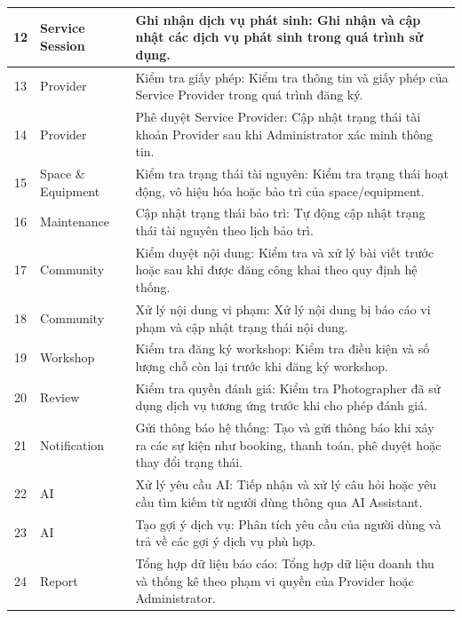 \begin{table}[H]
\begin{tabular}{|c|p{3cm}|p{6cm}|}
		12 & Service Session & Ghi nhận dịch vụ phát sinh: Ghi nhận và cập nhật các dịch vụ phát sinh trong quá trình sử dụng. \\
		\hline
		
		13 & Provider & Kiểm tra giấy phép: Kiểm tra thông tin và giấy phép của Service Provider trong quá trình đăng ký. \\
		\hline
		
		14 & Provider & Phê duyệt Service Provider: Cập nhật trạng thái tài khoản Provider sau khi Administrator xác minh thông tin. \\
		\hline
		
		15 & Space \& Equipment & Kiểm tra trạng thái tài nguyên: Kiểm tra trạng thái hoạt động, vô hiệu hóa hoặc bảo trì của space/equipment. \\
		\hline
		
		16 & Maintenance & Cập nhật trạng thái bảo trì: Tự động cập nhật trạng thái tài nguyên theo lịch bảo trì. \\
		\hline
		
		17 & Community & Kiểm duyệt nội dung: Kiểm tra và xử lý bài viết trước hoặc sau khi được đăng công khai theo quy định hệ thống. \\
		\hline
		
		18 & Community & Xử lý nội dung vi phạm: Xử lý nội dung bị báo cáo vi phạm và cập nhật trạng thái nội dung. \\
		\hline
		
		19 & Workshop & Kiểm tra đăng ký workshop: Kiểm tra điều kiện và số lượng chỗ còn lại trước khi đăng ký workshop. \\
		\hline
		
		20 & Review & Kiểm tra quyền đánh giá: Kiểm tra Photographer đã sử dụng dịch vụ tương ứng trước khi cho phép đánh giá. \\
		\hline
		
		21 & Notification & Gửi thông báo hệ thống: Tạo và gửi thông báo khi xảy ra các sự kiện như booking, thanh toán, phê duyệt hoặc thay đổi trạng thái. \\
		\hline
		
		22 & AI & Xử lý yêu cầu AI: Tiếp nhận và xử lý câu hỏi hoặc yêu cầu tìm kiếm từ người dùng thông qua AI Assistant. \\
		\hline
		
		23 & AI & Tạo gợi ý dịch vụ: Phân tích yêu cầu của người dùng và trả về các gợi ý dịch vụ phù hợp. \\
		\hline
		
		24 & Report & Tổng hợp dữ liệu báo cáo: Tổng hợp dữ liệu doanh thu và thống kê theo phạm vi quyền của Provider hoặc Administrator. \\
		\hline
		

\end{tabular}
\end{table}

